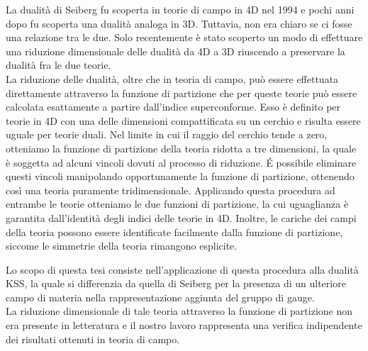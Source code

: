 \documentclass[a4paper,12pt]{article}
\begin{document}
La dualità di Seiberg fu scoperta in teorie di campo in 4D nel 1994 e pochi anni dopo fu scoperta una dualità analoga in 3D.
Tuttavia, non era chiaro se ci fosse una relazione tra le due.
Solo recentemente è stato scoperto un modo di effettuare una riduzione dimensionale delle dualità da 4D a 3D riuscendo a preservare la dualità fra le due teorie. \\
La riduzione delle dualità, oltre che in teoria di campo, può essere effettuata direttamente attraverso la funzione di partizione che per queste teorie può essere calcolata esattamente a partire dall'indice superconforme.
Esso è definito per teorie in 4D con una delle dimensioni compattificata su un cerchio e risulta essere uguale per teorie duali.
Nel limite in cui il raggio del cerchio tende a zero, otteniamo la funzione di partizione della teoria ridotta a tre dimensioni, la quale è soggetta ad alcuni vincoli dovuti al processo di riduzione.
\'E possibile eliminare questi vincoli manipolando opportunamente la funzione di partizione, ottenendo così una teoria puramente tridimensionale. 
Applicando questa procedura ad entrambe le teorie otteniamo le due funzioni di partizione, la cui uguaglianza è garantita dall'identità degli indici delle teorie in 4D.
Inoltre, le cariche dei campi della teoria possono essere identificate facilmente dalla funzione di partizione, siccome le simmetrie della teoria rimangono esplicite.

Lo scopo di questa tesi consiste nell'applicazione di questa procedura alla dualità KSS, la quale si differenzia da quella di Seiberg per la presenza di un ulteriore campo di materia nella rappresentazione aggiunta del gruppo di gauge. \\
La riduzione dimensionale di tale teoria attraverso la funzione di partizione non era presente in letteratura e il nostro lavoro rappresenta una verifica indipendente dei risultati ottenuti in teoria di campo. 
\end{document}
